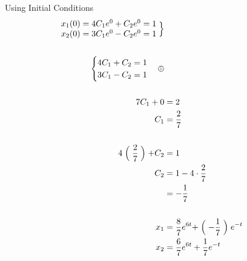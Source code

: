 \documentclass[10pt, letterpaper]{article}
\begin{document}
Using Initial Conditions
\begin{align*}
\begin{matrix}
	x_1(0)=4C_1e^0+C_2e^0=1\\
	x_2(0)=3C_1e^0-C_2e^0=1
\end{matrix} \Bigm\} \\
\\
\begin{cases}
	4C_1+C_2=1\\
	3C_1-C_2=1
\end{cases} \oplus \\
\\
7C_1+0 &= 2\\
C_1 &= \frac{2}{7}\\
\\
4 \Bigm( \frac{2}{7} \Bigm) + C_2 &= 1\\
C_2 &= 1-4 \cdot \frac{2}{7}\\
&= -\frac{1}{7}\\
\\
x_1 &= \frac{8}{7}e^{6t}+ \Bigm( -\frac{1}{7} \Bigm) e^{-t}\\
x_2 &= \frac{6}{7}e^{6t}+ \frac{1}{7}e^{-t}
\end{align*}
\end{document}
